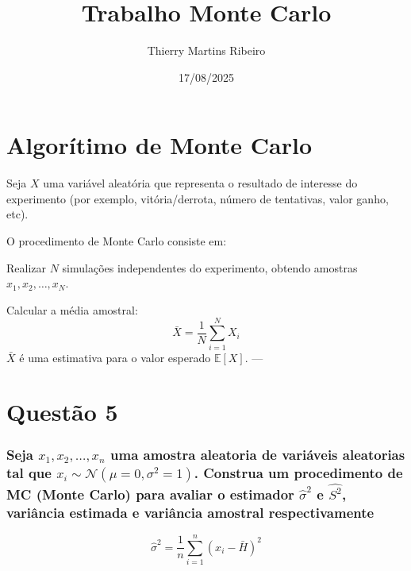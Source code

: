 \documentclass[
]{article}
\title{Trabalho Monte Carlo}
\author{Thierry Martins Ribeiro}
\date{17/08/2025}
\begin{document}
\maketitle

\section{Algorítimo de Monte Carlo}\label{algoruxedtimo-de-monte-carlo}

Seja \(X\) uma variável aleatória que representa o resultado de
interesse do experimento (por exemplo, vitória/derrota, número de
tentativas, valor ganho, etc).

O procedimento de Monte Carlo consiste em:

Realizar \(N\) simulações independentes do experimento, obtendo amostras
\(x_1, x_2, \dots, x_N\).

Calcular a média amostral:
\[ \bar{X} = \frac{1}{N} \sum_{i=1}^{N} X_i \] \(\bar{X}\) é uma
estimativa para o valor esperado \(\mathbb{E}[X]\). ---

\section{Questão 5}\label{questuxe3o-5}

\subsubsection{\texorpdfstring{Seja \({x_1, x_2, \dots, x_n}\) uma
amostra aleatoria de variáveis aleatorias tal que
\(x_i \sim \mathcal{N}(\mu = 0, \sigma^2 = 1)\). Construa um
procedimento de MC (Monte Carlo) para avaliar o estimador
\(\hat{\sigma}^2\) e \(\hat{S^2}\), variância estimada e variância
amostral
respectivamente}{Seja \{x\_1, x\_2, \textbackslash dots, x\_n\} uma amostra aleatoria de variáveis aleatorias tal que x\_i \textbackslash sim \textbackslash mathcal\{N\}(\textbackslash mu = 0, \textbackslash sigma\^{}2 = 1). Construa um procedimento de MC (Monte Carlo) para avaliar o estimador \textbackslash hat\{\textbackslash sigma\}\^{}2 e \textbackslash hat\{S\^{}2\}, variância estimada e variância amostral respectivamente}}\label{seja-x_1-x_2-dots-x_n-uma-amostra-aleatoria-de-variuxe1veis-aleatorias-tal-que-x_i-sim-mathcalnmu-0-sigma2-1.-construa-um-procedimento-de-mc-monte-carlo-para-avaliar-o-estimador-hatsigma2-e-hats2-variuxe2ncia-estimada-e-variuxe2ncia-amostral-respectivamente}

\[
\hat{\sigma}^2 = \frac{1}{n} \sum_{i=1}^{n} (x_i - \bar{H})^2 
\]
\end{document}
